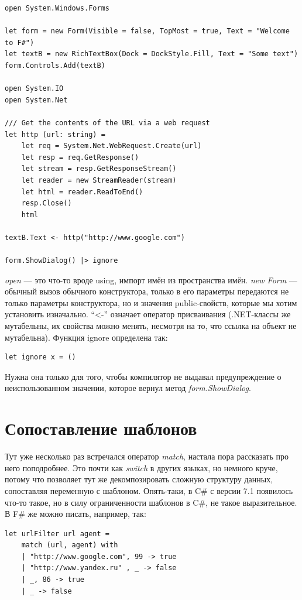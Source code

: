\documentclass[a5paper]{article}
\begin{document}
\begin{verbatim}
open System.Windows.Forms

let form = new Form(Visible = false, TopMost = true, Text = "Welcome to F#")
let textB = new RichTextBox(Dock = DockStyle.Fill, Text = "Some text")
form.Controls.Add(textB)

open System.IO
open System.Net

/// Get the contents of the URL via a web request
let http (url: string) =
    let req = System.Net.WebRequest.Create(url)
    let resp = req.GetResponse()
    let stream = resp.GetResponseStream()
    let reader = new StreamReader(stream)
    let html = reader.ReadToEnd()
    resp.Close()
    html

textB.Text <- http("http://www.google.com")

form.ShowDialog() |> ignore
\end{verbatim}

\textit{open} --- это что-то вроде using, импорт имён из пространства имён. \textit{new Form} --- обычный вызов обычного конструктора, только в его параметры передаются не только параметры конструктора, но и значения public-свойств, которые мы хотим установить изначально. ``<-'' означает оператор присваивания (.NET-классы же мутабельны, их свойства можно менять, несмотря на то, что ссылка на объект не мутабельна). Функция ignore определена так:

\begin{verbatim}
let ignore x = ()
\end{verbatim}

Нужна она только для того, чтобы компилятор не выдавал предупреждение о неиспользованном значении, которое вернул метод \textit{form.ShowDialog}.

\section{Сопоставление шаблонов}

Тут уже несколько раз встречался оператор \textit{match}, настала пора рассказать про него поподробнее. Это почти как \textit{switch} в других языках, но немного круче, потому что позволяет тут же декомпозировать сложную структуру данных, сопоставляя переменную с шаблоном. Опять-таки, в C\# с версии 7.1 появилось что-то такое, но в силу ограниченности шаблонов в C\#, не такое выразительное. В F\# же можно писать, например, так:

\begin{verbatim}
let urlFilter url agent =
    match (url, agent) with
    | "http://www.google.com", 99 -> true
    | "http://www.yandex.ru" , _ -> false
    | _, 86 -> true
    | _ -> false
\end{verbatim}
\end{document}
